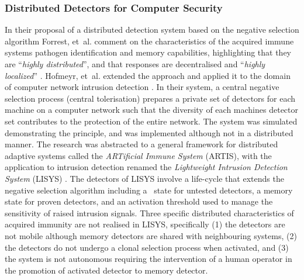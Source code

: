 %
%
\subsubsection{Distributed Detectors for Computer Security}
\label{subsubsec:distrb:review:security}
In their proposal of a distributed detection system based on the negative selection algorithm Forrest, et~al. comment on the characteristics of the acquired immune systems pathogen identification and memory capabilities, highlighting that they are ``\emph{highly distributed}'', and that responses are decentralised and ``\emph{highly localized}'' \cite{Forrest1997a, Hofmeyr1999a}. Hofmeyr, et~al. extended the approach and applied it to the domain of computer network intrusion detection \cite{Hofmeyr1999}. In their system, a central negative selection process (central tolerisation) prepares a private set of detectors for each machine on a computer network such that the diversity of each machines detector set contributes to the protection of the entire network. The system was simulated demonstrating the principle, and was implemented although not in a distributed manner. The research was abstracted to a general framework for distributed adaptive systems called the \emph{ARTificial Immune System} (ARTIS), with the application to intrusion detection renamed the \emph{Lightweight Intrusion Detection System} (LISYS) \cite{Hofmeyr2000}. The detectors of LISYS involve a life-cycle that extends the negative selection algorithm including a \naive\ state for untested detectors, a memory state for proven detectors, and an activation threshold used to manage the sensitivity of raised intrusion signals. Three specific distributed characteristics of acquired immunity are not realised in LISYS, specifically (1) the detectors are not mobile although memory detectors are shared with neighbouring systems, (2) the detectors do not undergo a clonal selection process when activated, and (3) the system is not autonomous requiring the intervention of a human operator in the promotion of activated detector to memory detector.


